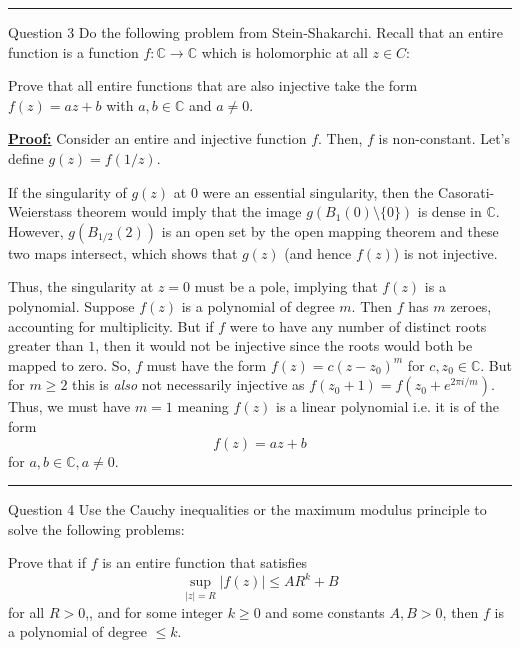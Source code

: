 \documentclass{article}
\newcommand{\C}{\mathbb{C}}
\begin{document}
\vskip 0.5cm
\hrule 
\vskip 0.5cm




\begin{mathdefinitionbox}{Question 3}
\vskip 0.5cm
Do the following problem from Stein-Shakarchi. Recall that an entire function is a function $f : \C \rightarrow \C$ which is holomorphic at all $z \in C$:

\begin{dottedbox}
  Prove that all entire functions that are also injective take the form $f(z) = az + b$ with $a, b \in \C$ and $a \neq 0$.
\end{dottedbox}

\end{mathdefinitionbox}

\vskip 0.5cm
\underline{\textbf{Proof:}}
Consider an entire and injective function $f$. Then, $f$ is non-constant. Let's define $g(z) = f(1/z)$. 

\vskip 0.5cm
If the singularity of $g(z)$ at $0$ were an essential singularity, then the Casorati-Weierstass theorem would imply that the image $g\left(B_1(0) \setminus \{0\}\right)$ is dense in $\C$. However, $g\left(B_{1/2}(2)\right)$ is an open set by the open mapping theorem and these two maps intersect, which shows that $g(z)$ (and hence $f(z)$) is not injective.

\vskip 0.5cm
Thus, the singularity at $z = 0$ must be a pole, implying that $f(z)$ is a polynomial. Suppose $f(z)$ is a polynomial of degree $m$. Then $f$ has $m$ zeroes, accounting for multiplicity. But if $f$ were to have any number of distinct roots greater than $1$, then it would not be injective since the roots would both be mapped to zero. So, $f$ must have the form $f(z) = c(z-z_0)^m$ for $c, z_0 \in \C$. But for $m \geq 2$ this is \emph{also} not necessarily injective as $f(z_0 + 1) = f(z_0 + e^{2\pi i/m})$. Thus, we must have $m = 1$ meaning $f(z)$ is a linear polynomial i.e. it is of the form 
\[ f(z) = az + b \] for $a, b \in \C, a \neq 0$.

\vskip 0.5cm
\hrule 
\vskip 0.5cm



\begin{mathdefinitionbox}{Question 4}
\vskip 0.5cm
Use the Cauchy inequalities or the maximum modulus principle to solve the following problems:

\begin{dottedbox}
  Prove that if $f$ is an entire function that satisfies 
  \[ \sup_{|z| = R} \left| f(z) \right| \leq AR^k + B \] for all $R > 0$,, and for some integer $k \geq 0$ and some constants $A, B > 0$, then $f$ is a polynomial of degree $\leq k$.
\end{dottedbox}

\end{mathdefinitionbox}
\end{document}
